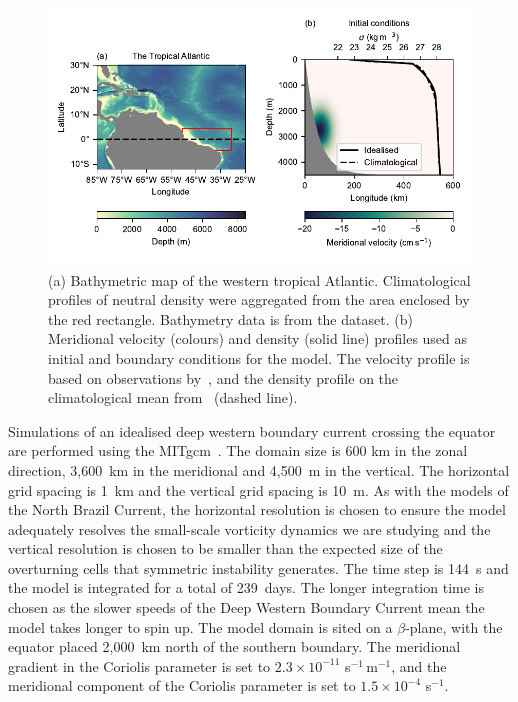 \begin{figure}[p]
    \centering
    \includegraphics[width=\textwidth]{../figures/Figure1.pdf}
    \caption{(a) Bathymetric map of the western tropical Atlantic. Climatological profiles of neutral density were aggregated from the area enclosed by the red rectangle. Bathymetry data is from the \citet{GEBCO2020} dataset. (b) Meridional velocity (colours) and density (solid line) profiles used as initial and boundary conditions for the model. The velocity profile is based on observations by~\citet{Schott2005}, and the density profile on the climatological mean from~\citet{WOA2018} (dashed line).}
    \label{fig:fig1}
\end{figure}
Simulations of an idealised deep western boundary current crossing the equator are performed using the MITgcm~\citep{Marshall1997}. The domain size is 600 km in the zonal direction, 3,600~km in the meridional and 4,500~m in the vertical. The horizontal grid spacing is 1~km and the vertical grid spacing is 10~m. As with the models of the North Brazil Current, the horizontal resolution is chosen to ensure the model adequately resolves the small-scale vorticity dynamics we are studying and the vertical resolution is chosen to be smaller than the expected size of the overturning cells that symmetric instability generates\footnotemark.
The time step is 144~s and the model is integrated for a total of 239~days. The longer integration time is chosen as the slower speeds of the Deep Western Boundary Current mean the model takes longer to spin up. The model domain is sited on a $\beta$-plane, with the equator placed 2,000~km north of the southern boundary. The meridional gradient in the Coriolis parameter is set to $2.3 \times 10^{-11}$ s$^{-1}\,$m$^{-1}$, and the meridional component of the Coriolis parameter is set to $1.5 \times 10^{-4}$ s$^{-1}$.

